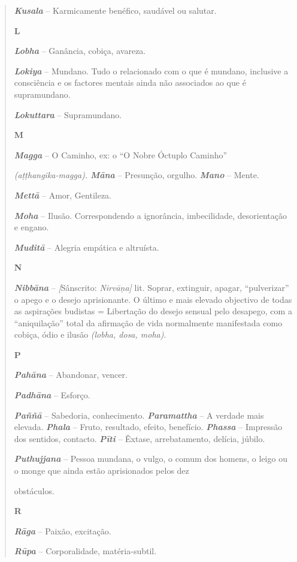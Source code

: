 \begin{quote}
\emph{\textbf{Kusala}} -- Karmicamente benéfico, saudável ou salutar.

\textbf{L}

\emph{\textbf{Lobha}} -- Ganância, cobiça, avareza.

\emph{\textbf{Lokiya}} -- Mundano. Tudo o relacionado com o que é mundano, inclusive a consciência e os factores mentais ainda não associados ao que é supramundano.

\emph{\textbf{Lokuttara}} -- Supramundano.

\textbf{M}

\emph{\textbf{Magga}} -- O Caminho, ex: o ``O Nobre Óctuplo Caminho''

\emph{(aṭṭhangika-magga). \textbf{Māna }}-- Presunção, orgulho. \emph{\textbf{Mano}} -- Mente.

\emph{\textbf{Mettā}} -- Amor, Gentileza.

\emph{\textbf{Moha}} -- Ilusão. Correspondendo a ignorância, imbecilidade, desorientação e engano.

\emph{\textbf{Muditā}} -- Alegria empática e altruísta.

\textbf{N}

\emph{\textbf{Nibbāna}} -- \emph{{[}}Sânscrito: \emph{Nirvāṇa{]}} lit. Soprar, extinguir, apagar, ``pulverizar'' o apego e o desejo aprisionante. O último e mais elevado objectivo de todas as aspirações budistas = Libertação do desejo sensual pelo desapego, com a ``aniquilação'' total da afirmação de vida normalmente manifestada como cobiça, ódio e ilusão \emph{(lobha, dosa, moha)}.

\textbf{P}

\emph{\textbf{Pahāna}} -- Abandonar, vencer.

\emph{\textbf{Padhāna}} -- Esforço.

\emph{\textbf{Paññā}} -- Sabedoria, conhecimento. \emph{\textbf{Paramattha}} -- A verdade mais elevada. \emph{\textbf{Phala}} -- Fruto, resultado, efeito, benefício. \emph{\textbf{Phassa}} -- Impressão dos sentidos, contacto. \emph{\textbf{Pīti}} -- Êxtase, arrebatamento, delícia, júbilo.

\emph{\textbf{Puthujjana}} -- Pessoa mundana, o vulgo, o comum dos homens, o leigo ou o monge que ainda estão aprisionados pelos dez

obstáculos.

\textbf{R}

\emph{\textbf{Rāga}} -- Paixão, excitação.

\emph{\textbf{Rūpa}} -- Corporalidade, matéria-subtil.


\end{quote}

